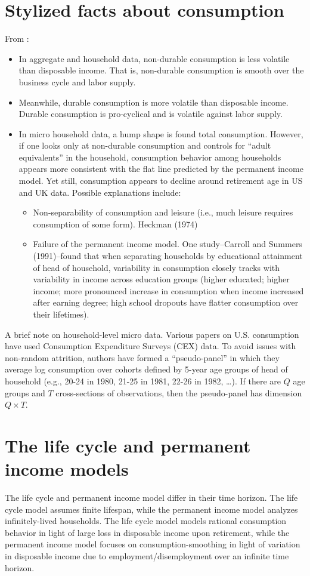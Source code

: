 \documentclass[11pt]{article}
\begin{document}
\section{Stylized facts about consumption}
From \textcite{attanasio}:
\begin{itemize}
    \item In aggregate and household data, non-durable consumption is less volatile than disposable income. That is, non-durable consumption is smooth over the business cycle and labor supply.
    \item Meanwhile, durable consumption is more volatile than disposable income. Durable consumption is pro-cyclical and is volatile against labor supply.
    \item In micro household data, a hump shape is found total consumption. However, if one looks only at non-durable consumption and controls for ``adult equivalents'' in the household, consumption behavior among households appears more consistent with the flat line predicted by the permanent income model. Yet still, consumption appears to decline around retirement age in US and UK data. Possible explanations include:
    \begin{itemize}
        \item Non-separability of consumption and leisure (i.e., much leisure requires consumption of some form). Heckman (1974)
        \item Failure of the permanent income model. One study--Carroll and Summers (1991)--found that when separating households by educational attainment of head of household, variability in consumption closely tracks with variability in income across education groups (higher educated; higher income; more pronounced increase in consumption when income increased after earning degree; high school dropouts have flatter consumption over their lifetimes).
    \end{itemize}
\end{itemize}

A brief note on household-level micro data. Various papers on U.S. consumption have used Consumption Expenditure Surveys (CEX) data. To avoid issues with non-random attrition, authors have formed a ``pseudo-panel'' in which they average log consumption over cohorts defined by 5-year age groups of head of household (e.g., 20-24 in 1980, 21-25 in 1981, 22-26 in 1982, \dots). If there are $Q$ age groups and $T$ cross-sections of observations, then the pseudo-panel has dimension $Q \times T$.

\section{The life cycle and permanent income models}
The life cycle and permanent income model differ in their time horizon. The life cycle model assumes finite lifespan, while the permanent income model analyzes infinitely-lived households. The life cycle model models rational consumption behavior in light of large loss in disposable income upon retirement, while the permanent income model focuses on consumption-smoothing in light of variation in disposable income due to employment/disemployment over an infinite time horizon.
\end{document}
